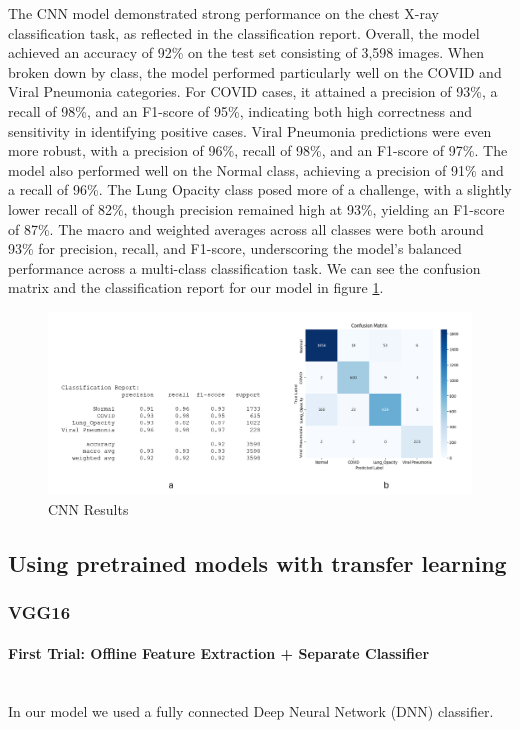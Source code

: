 \documentclass{article}
\begin{document}
The CNN model demonstrated strong performance on the chest X-ray classification task, as reflected in the classification report. Overall, the model achieved an accuracy of 92\% on the test set consisting of 3,598 images. When broken down by class, the model performed particularly well on the COVID and Viral Pneumonia categories. For COVID cases, it attained a precision of 93\%, a recall of 98\%, and an F1-score of 95\%, indicating both high correctness and sensitivity in identifying positive cases. Viral Pneumonia predictions were even more robust, with a precision of 96\%, recall of 98\%, and an F1-score of 97\%. The model also performed well on the Normal class, achieving a precision of 91\% and a recall of 96\%. The Lung Opacity class posed more of a challenge, with a slightly lower recall of 82\%, though precision remained high at 93\%, yielding an F1-score of 87\%. The macro and weighted averages across all classes were both around 93\% for precision, recall, and F1-score, underscoring the model’s balanced performance across a multi-class classification task.
We can see the confusion matrix and the classification report for our model in figure \ref{fig:cnn_results.png}.

\begin{figure}[h!] %
    \centering
    \includegraphics[width=1.0\linewidth]{cnn results.png}
    \caption{CNN Results}
    \label{fig:cnn_results.png}
\end{figure}

\subsection{Using pretrained models with transfer learning}

\subsubsection{VGG16}
\paragraph{First Trial: Offline Feature Extraction + Separate Classifier}\mbox{}\\
In our model we used a fully connected Deep Neural Network (DNN) classifier. 
\end{document}

